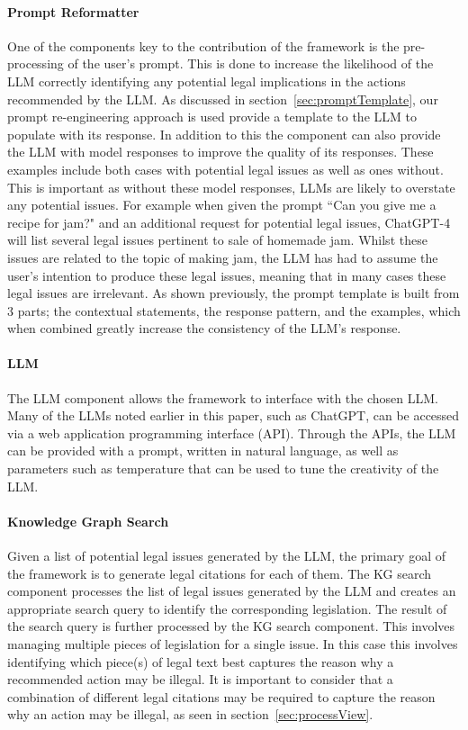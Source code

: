 \documentclass[sn-mathphys-num]{sn-jnl}%
\begin{document}
\paragraph{\textbf{Prompt Reformatter}}
One of the components key to the contribution of the framework is the pre-processing of the user's prompt. This is done to increase the likelihood of the LLM correctly identifying any potential legal implications in the actions recommended by the LLM. As discussed in section~\ref{sec:promptTemplate}, our prompt re-engineering approach is used provide a template to the LLM to populate with its response. In addition to this the component can also provide the LLM with model responses to improve the quality of its responses.
These examples include both cases with potential legal issues as well as ones without. This is important as without these model responses, LLMs are likely to overstate any potential issues. For example when given the prompt ``Can you give me a recipe for jam?" and an additional request for potential legal issues, ChatGPT-4 will list several legal issues pertinent to sale of homemade jam. Whilst these issues are related to the topic of making jam, the LLM has had to assume the user's intention to produce these legal issues, meaning that in many cases these legal issues are irrelevant. As shown previously, the prompt template is built from 3 parts; the contextual statements, the response pattern, and the examples, which when combined greatly increase the consistency of the LLM's response.

\paragraph{\textbf{LLM}}
The LLM component allows the framework to interface with the chosen LLM. Many of the LLMs noted earlier in this paper, such as ChatGPT, can be accessed via a web application programming interface (API). Through the APIs, the LLM can be provided with a prompt, written in natural language, as well as parameters such as temperature that can be used to tune the creativity of the LLM. 

\paragraph{\textbf{Knowledge Graph Search}}
Given a list of potential legal issues generated by the LLM, the primary goal of the framework is to generate legal citations for each of them. The KG search component processes the list of legal issues generated by the LLM and creates an appropriate search query to identify the corresponding legislation. The result of the search query is further processed by the KG search component. This involves managing multiple pieces of legislation for a single issue. In this case this involves identifying which piece(s) of legal text best captures the reason why a recommended action may be illegal. It is important to consider that a combination of different legal citations may be required to capture the reason why an action may be illegal, as seen in section~\ref{sec:processView}.
\end{document}
